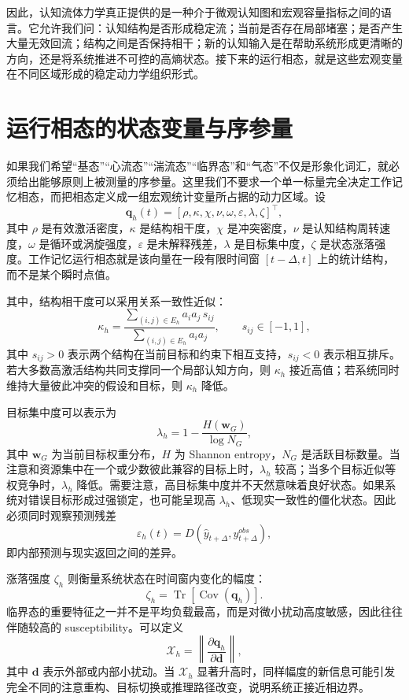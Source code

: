 因此，认知流体力学真正提供的是一种介于微观认知图和宏观容量指标之间的语言。它允许我们问：认知结构是否形成稳定流；当前是否存在局部堵塞；是否产生大量无效回流；结构之间是否保持相干；新的认知输入是在帮助系统形成更清晰的方向，还是将系统推进不可控的高熵状态。接下来的运行相态，就是这些宏观变量在不同区域形成的稳定动力学组织形式。

\section{运行相态的状态变量与序参量}

如果我们希望“基态”“心流态”“湍流态”“临界态”和“气态”不仅是形象化词汇，就必须给出能够原则上被测量的序参量。这里我们不要求一个单一标量完全决定工作记忆相态，而把相态定义成一组宏观统计变量所占据的动力区域。设
\[
\mathbf q_h(t)
=
[
\rho,
\kappa,
\chi,
\nu,
\omega,
\varepsilon,
\lambda,
\zeta
]^{\top},
\]
其中 $\rho$ 是有效激活密度，$\kappa$ 是结构相干度，$\chi$ 是冲突密度，$\nu$ 是认知结构周转速度，$\omega$ 是循环或涡旋强度，$\varepsilon$ 是未解释残差，$\lambda$ 是目标集中度，$\zeta$ 是状态涨落强度。工作记忆运行相态就是该向量在一段有限时间窗 $[t-\Delta,t]$ 上的统计结构，而不是某个瞬时点值。

其中，结构相干度可以采用关系一致性近似：
\[
\kappa_h
=
\frac{
\sum_{(i,j)\in E_h}
a_i a_j
\,s_{ij}
}{
\sum_{(i,j)\in E_h}
a_i a_j
},
\qquad
s_{ij}\in[-1,1],
\]
其中 $s_{ij}>0$ 表示两个结构在当前目标和约束下相互支持，$s_{ij}<0$ 表示相互排斥。若大多数高激活结构共同支撑同一个局部认知方向，则 $\kappa_h$ 接近高值；若系统同时维持大量彼此冲突的假设和目标，则 $\kappa_h$ 降低。

目标集中度可以表示为
\[
\lambda_h
=
1-
\frac{H(\mathbf w_G)}
{\log N_G},
\]
其中 $\mathbf w_G$ 为当前目标权重分布，$H$ 为 Shannon entropy，$N_G$ 是活跃目标数量。当注意和资源集中在一个或少数彼此兼容的目标上时，$\lambda_h$ 较高；当多个目标近似等权竞争时，$\lambda_h$ 降低。需要注意，高目标集中度并不天然意味着良好状态。如果系统对错误目标形成过强锁定，也可能呈现高 $\lambda_h$、低现实一致性的僵化状态。因此必须同时观察预测残差
\[
\varepsilon_h(t)
=
D\left(
\widehat y_{t+\Delta},
y_{t+\Delta}^{obs}
\right),
\]
即内部预测与现实返回之间的差异。

涨落强度 $\zeta_h$ 则衡量系统状态在时间窗内变化的幅度：
\[
\zeta_h
=
\operatorname{Tr}
\left[
\operatorname{Cov}
\left(
\mathbf q_h
\right)
\right].
\]
临界态的重要特征之一并不是平均负载最高，而是对微小扰动高度敏感，因此往往伴随较高的 susceptibility。可以定义
\[
\mathcal X_h
=
\left\|
\frac{\partial \mathbf q_h}
{\partial \mathbf d}
\right\|,
\]
其中 $\mathbf d$ 表示外部或内部小扰动。当 $\mathcal X_h$ 显著升高时，同样幅度的新信息可能引发完全不同的注意重构、目标切换或推理路径改变，说明系统正接近相边界。

